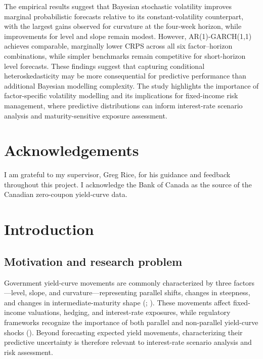 \documentclass[
  12pt,
  letterpaper,
  DIV=11,
  numbers=noendperiod]{scrreprt}
\let\MRPListFigures\listoffigures
\let\MRPListTables\listoftables
\renewcommand{\listoffigures}{}
\renewcommand{\listoftables}{}
\begin{document}
The empirical results suggest that Bayesian stochastic volatility
improves marginal probabilistic forecasts relative to its
constant-volatility counterpart, with the largest gains observed for
curvature at the four-week horizon, while improvements for level and
slope remain modest. However, AR(1)-GARCH(1,1) achieves comparable,
marginally lower CRPS across all six factor--horizon combinations, while
simpler benchmarks remain competitive for short-horizon level forecasts.
These findings suggest that capturing conditional heteroskedasticity may
be more consequential for predictive performance than additional
Bayesian modelling complexity. The study highlights the importance of
factor-specific volatility modelling and its implications for
fixed-income risk management, where predictive distributions can inform
interest-rate scenario analysis and maturity-sensitive exposure
assessment.

\clearpage
\chapter*{Acknowledgements}

I am grateful to my supervisor, Greg Rice, for his guidance and feedback
throughout this project. I acknowledge the Bank of Canada as the source
of the Canadian zero-coupon yield-curve data.

\clearpage
\setcounter{tocdepth}{0}
\tableofcontents
\setcounter{tocdepth}{2}
\clearpage
\MRPListTables
\clearpage
\MRPListFigures
\clearpage
{}

\chapter{Introduction}\label{sec-introduction}

\section{Motivation and research
problem}\label{motivation-and-research-problem}

Government yield-curve movements are commonly characterized by three
factors---level, slope, and curvature---representing parallel shifts,
changes in steepness, and changes in intermediate-maturity shape
(;
).
These movements affect fixed-income valuations, hedging, and
interest-rate exposures, while regulatory frameworks recognize the
importance of both parallel and non-parallel yield-curve shocks
(). Beyond forecasting expected yield movements, characterizing
their predictive uncertainty is therefore relevant to interest-rate
scenario analysis and risk assessment.
\end{document}
